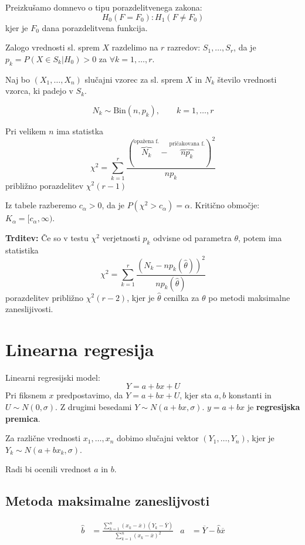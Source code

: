\begin{multicols}{5}
Preizkušamo domnevo o tipu porazdelitvenega zakona:
\[ H_0(F = F_0) : H_1(F \neq F_0)\]
kjer je $F_0$ dana porazdelitvena funkcija.

Zalogo vrednosti sl. sprem $X$ razdelimo na $r$ razredov: $S_1, \dots, S_r$, da je $p_k = P(X \in S_k | H_0) > 0$ za $\forall k = 1, \dots, r$.

Naj bo $(X_1, \dots, X_n)$ slučajni vzorec za sl. sprem $X$ in $N_k$ število vrednosti vzorca, ki padejo v $S_k$. 

\[ N_k \sim \text{Bin}(n, p_k), \qquad k = 1, \dots, r\]

Pri velikem $n$ ima statistka
\[\chi^2 = \sum_{k=1}^r \frac{(\overbrace{N_k}^{\text{opažena f.}} - \overbrace{np_k}^{\text{pričakovana f.}})^2}{np_k}\]
približno porazdelitev $\chi^2(r-1)$

Iz tabele razberemo $c_{\alpha} > 0$, da je $P(\chi^2 > c_{\alpha}) = \alpha$. Kritično območje: $K_{\alpha} = [c_{\alpha}, \infty)$.

\textbf{Trditev:} Če so v testu $\chi^2$ verjetnosti $p_k$ odvisne od parametra $\theta$, potem ima statistika
\[ \chi^2 = \sum_{k=1}^r \frac{({N_k} - {np_k(\hat{\theta})})^2}{np_k(\hat{\theta})}\]
porazdelitev približno $\chi^2(r-2)$, kjer je $\hat{\theta}$ cenilka za $\theta$ po metodi maksimalne zaneslijivosti.

\section{Linearna regresija }

Linearni regresijski model:
\[ Y = a + bx + U\]
Pri fiksnem $x$ predpostavimo, da $Y = a + bx + U$, kjer sta $a, b$ konstanti in $U \sim N(0, \sigma)$. 
Z drugimi besedami $Y \sim N(a+bx, \sigma)$. $y = a+bx$ je \textbf{regresijska premica}.

Za različne vrednosti $x_1, \dots, x_n$ dobimo slučajni vektor $(Y_1, \dots, Y_n)$, kjer je $Y_k \sim N(a+bx_k, \sigma)$.

Radi bi ocenili vrednost $a$ in $b$.

\subsection{Metoda maksimalne zaneslijvosti}
\begin{align*}
    \hat{b} &= \frac{\sum_{k=1}^n (x_k - \overline{x})(Y_k - \overline{Y})}{\sum_{k=1}^n (x_k - \overline{x})^2} &
    \hat{a} &= \overline{Y} - \hat{b}\overline{x}
\end{align*}


\end{multicols}
